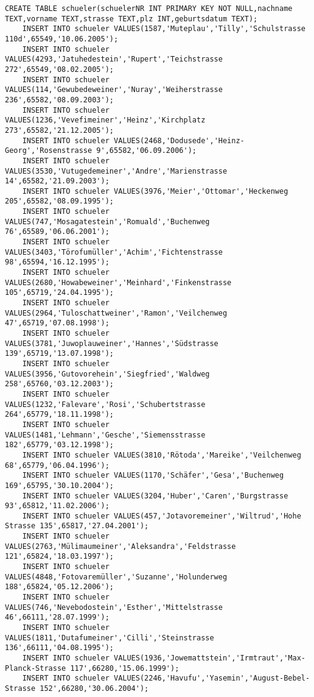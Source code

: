 \begin{lstlisting}[breaklines=True, numbers=none, basicstyle=\tiny, keepspaces=false]
	CREATE TABLE schueler(schuelerNR INT PRIMARY KEY NOT NULL,nachname TEXT,vorname TEXT,strasse TEXT,plz INT,geburtsdatum TEXT);
	INSERT INTO schueler VALUES(1587,'Muteplau','Tilly','Schulstrasse 110d',65549,'10.06.2005');
	INSERT INTO schueler VALUES(4293,'Jatuhedestein','Rupert','Teichstrasse 272',65549,'08.02.2005');
	INSERT INTO schueler VALUES(114,'Gewubedeweiner','Nuray','Weiherstrasse 236',65582,'08.09.2003');
	INSERT INTO schueler VALUES(1236,'Vevefimeiner','Heinz','Kirchplatz 273',65582,'21.12.2005');
	INSERT INTO schueler VALUES(2468,'Dodusede','Heinz-Georg','Rosenstrasse 9',65582,'06.09.2006');
	INSERT INTO schueler VALUES(3530,'Vutugedemeiner','Andre','Marienstrasse 14',65582,'21.09.2003');
	INSERT INTO schueler VALUES(3976,'Meier','Ottomar','Heckenweg 205',65582,'08.09.1995');
	INSERT INTO schueler VALUES(747,'Mosagatestein','Romuald','Buchenweg 76',65589,'06.06.2001');
	INSERT INTO schueler VALUES(3403,'Törofumüller','Achim','Fichtenstrasse 98',65594,'16.12.1995');
	INSERT INTO schueler VALUES(2680,'Howabeweiner','Meinhard','Finkenstrasse 105',65719,'24.04.1995');
	INSERT INTO schueler VALUES(2964,'Tuloschattweiner','Ramon','Veilchenweg 47',65719,'07.08.1998');
	INSERT INTO schueler VALUES(3781,'Juwoplauweiner','Hannes','Südstrasse 139',65719,'13.07.1998');
	INSERT INTO schueler VALUES(3956,'Gutovorehein','Siegfried','Waldweg 258',65760,'03.12.2003');
	INSERT INTO schueler VALUES(1232,'Falevare','Rosi','Schubertstrasse 264',65779,'18.11.1998');
	INSERT INTO schueler VALUES(1481,'Lehmann','Gesche','Siemensstrasse 182',65779,'03.12.1998');
	INSERT INTO schueler VALUES(3810,'Rötoda','Mareike','Veilchenweg 68',65779,'06.04.1996');
	INSERT INTO schueler VALUES(1170,'Schäfer','Gesa','Buchenweg 169',65795,'30.10.2004');
	INSERT INTO schueler VALUES(3204,'Huber','Caren','Burgstrasse 93',65812,'11.02.2006');
	INSERT INTO schueler VALUES(457,'Jotavoremeiner','Wiltrud','Hohe Strasse 135',65817,'27.04.2001');
	INSERT INTO schueler VALUES(2763,'Mülimaumeiner','Aleksandra','Feldstrasse 121',65824,'18.03.1997');
	INSERT INTO schueler VALUES(4848,'Fotovaremüller','Suzanne','Holunderweg 188',65824,'05.12.2006');
	INSERT INTO schueler VALUES(746,'Nevebodostein','Esther','Mittelstrasse 46',66111,'28.07.1999');
	INSERT INTO schueler VALUES(1811,'Dutafumeiner','Cilli','Steinstrasse 136',66111,'04.08.1995');
	INSERT INTO schueler VALUES(1936,'Jowemattstein','Irmtraut','Max-Planck-Strasse 117',66280,'15.06.1999');
	INSERT INTO schueler VALUES(2246,'Havufu','Yasemin','August-Bebel-Strasse 152',66280,'30.06.2004');

\end{lstlisting}

